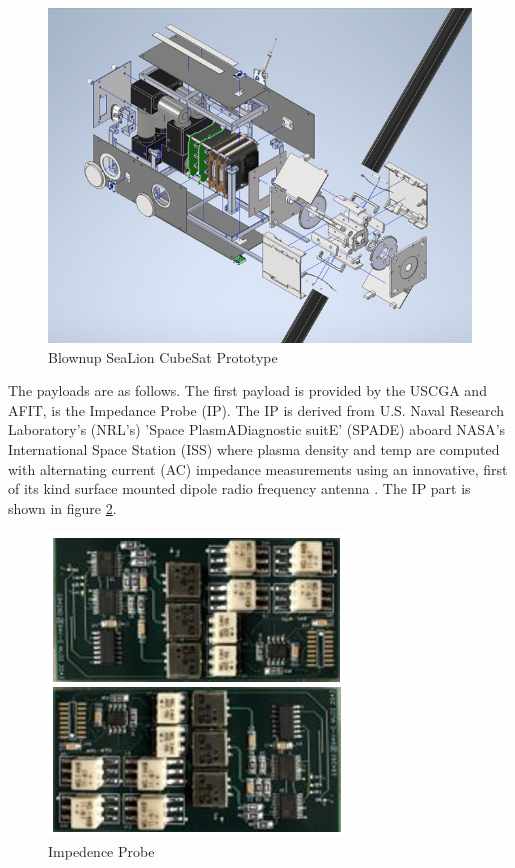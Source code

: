 \documentclass[journal,article,submit,pdftex,moreauthors]{Definitions/mdpi}
\begin{document}
\begin{figure}[H]
    \includegraphics[width=10.5 cm]{assets/cubesat_blownup.png}
    \caption{Blownup SeaLion CubeSat Prototype}
	\label{fig:cubesat_blowup}
    \end{figure}
	\noindent   
\unskip

The payloads are as follows. The first payload is provided by the USCGA and AFIT, is the Impedance Probe (IP).  The IP is derived from U.S. Naval Research Laboratory's (NRL's) 'Space PlasmADiagnostic suitE' (SPADE) aboard NASA's International Space Station (ISS) where plasma density and temp are computed with alternating current (AC) impedance measurements using an innovative, first of its kind surface mounted dipole radio frequency antenna \cite{sealion_cdr}.  The IP part is shown in figure \ref{fig:IP}.

\begin{figure}[H]
    \includegraphics{assets/impedence.png}
    \caption{Impedence Probe}
	\label{fig:IP}
    \end{figure}
	\noindent   
\unskip
\end{document}
